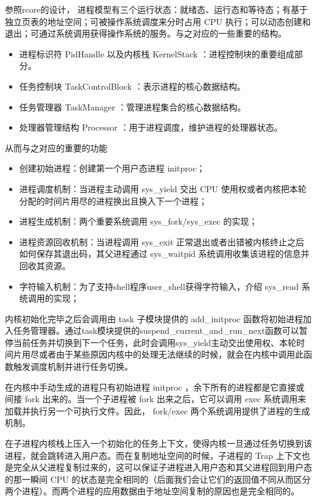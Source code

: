 参照rcore的设计， 进程模型有三个运行状态：就绪态、运行态和等待态；有基于独立页表的地址空间；可被操作系统调度来分时占用 CPU 执行；可以动态创建和退出；可通过系统调用获得操作系统的服务。与之对应的一些重要的结构。

\begin{itemize}
\item 进程标识符 PidHandle 以及内核栈 KernelStack ：进程控制块的重要组成部分。
\item 任务控制块 TaskControlBlock ：表示进程的核心数据结构。
\item 任务管理器 TaskManager ：管理进程集合的核心数据结构。
\item 处理器管理结构 Processor ：用于进程调度，维护进程的处理器状态。
\end{itemize}

从而与之对应的重要的功能

\begin{itemize}
\item 创建初始进程：创建第一个用户态进程 initproc；
\item 进程调度机制：当进程主动调用 sys\_yield 交出 CPU 使用权或者内核把本轮分配的时间片用尽的进程换出且换入下一个进程；
\item 进程生成机制：两个重要系统调用 sys\_fork/sys\_exec 的实现；
\item 进程资源回收机制：当进程调用 sys\_exit 正常退出或者出错被内核终止之后如何保存其退出码，其父进程通过 sys\_waitpid 系统调用收集该进程的信息并回收其资源。
\item 字符输入机制：为了支持shell程序user\_shell获得字符输入，介绍 sys\_read 系统调用的实现；
\end{itemize}

内核初始化完毕之后会调用由 task 子模块提供的 add\_initproc 函数将初始进程加入任务管理器。通过task模块提供的suspend\_current\_and\_run\_next函数可以暂停当前任务并切换到下一个任务，此时会调用sys\_yield主动交出使用权、本轮时间片用尽或者由于某些原因内核中的处理无法继续的时候，就会在内核中调用此函数触发调度机制并进行任务切换。

在内核中手动生成的进程只有初始进程 initproc ，余下所有的进程都是它直接或间接 fork 出来的。当一个子进程被 fork 出来之后，它可以调用 exec 系统调用来加载并执行另一个可执行文件。因此， fork/exec 两个系统调用提供了进程的生成机制。

在子进程内核栈上压入一个初始化的任务上下文，使得内核一旦通过任务切换到该进程，就会跳转进入用户态。而在复制地址空间的时候，子进程的 Trap 上下文也是完全从父进程复制过来的，这可以保证子进程进入用户态和其父进程回到用户态的那一瞬间 CPU 的状态是完全相同的（后面我们会让它们的返回值不同从而区分两个进程）。而两个进程的应用数据由于地址空间复制的原因也是完全相同的。

